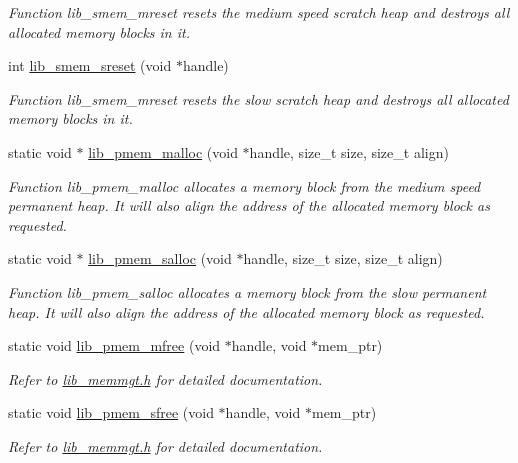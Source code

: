 \begin{DoxyCompactItemize}
\begin{DoxyCompactList}\small\item\em Function lib\+\_\+smem\+\_\+mreset resets the medium speed scratch heap and destroys all allocated memory blocks in it. \end{DoxyCompactList}\item 
int \hyperlink{group__libarch__memmgt_gaa3fb30e824c80ec62d4e7847f292108f}{lib\+\_\+smem\+\_\+sreset} (void $\ast$handle)
\begin{DoxyCompactList}\small\item\em Function lib\+\_\+smem\+\_\+mreset resets the slow scratch heap and destroys all allocated memory blocks in it. \end{DoxyCompactList}\item 
static void $\ast$ \hyperlink{group__libarch__memmgt_gaeae499cb566d6411b938107d3ffeb144}{lib\+\_\+pmem\+\_\+malloc} (void $\ast$handle, size\+\_\+t size, size\+\_\+t align)
\begin{DoxyCompactList}\small\item\em Function lib\+\_\+pmem\+\_\+malloc allocates a memory block from the medium speed permanent heap. It will also align the address of the allocated memory block as requested. \end{DoxyCompactList}\item 
static void $\ast$ \hyperlink{group__libarch__memmgt_ga306a1aa220281f0b6d79b12928bfeff8}{lib\+\_\+pmem\+\_\+salloc} (void $\ast$handle, size\+\_\+t size, size\+\_\+t align)
\begin{DoxyCompactList}\small\item\em Function lib\+\_\+pmem\+\_\+salloc allocates a memory block from the slow permanent heap. It will also align the address of the allocated memory block as requested. \end{DoxyCompactList}\item 
static void \hyperlink{group__libarch__memmgt_gafeda2ec3f28d9ebb87a8adcecbb0f414}{lib\+\_\+pmem\+\_\+mfree} (void $\ast$handle, void $\ast$mem\+\_\+ptr)
\begin{DoxyCompactList}\small\item\em Refer to \hyperlink{lib__memmgt_8h}{lib\+\_\+memmgt.\+h} for detailed documentation. \end{DoxyCompactList}\item 
static void \hyperlink{group__libarch__memmgt_gab12e1d41b3d71633c9ab2d8818510f63}{lib\+\_\+pmem\+\_\+sfree} (void $\ast$handle, void $\ast$mem\+\_\+ptr)
\begin{DoxyCompactList}\small\item\em Refer to \hyperlink{lib__memmgt_8h}{lib\+\_\+memmgt.\+h} for detailed documentation. \end{DoxyCompactList}\end{DoxyCompactItemize}


